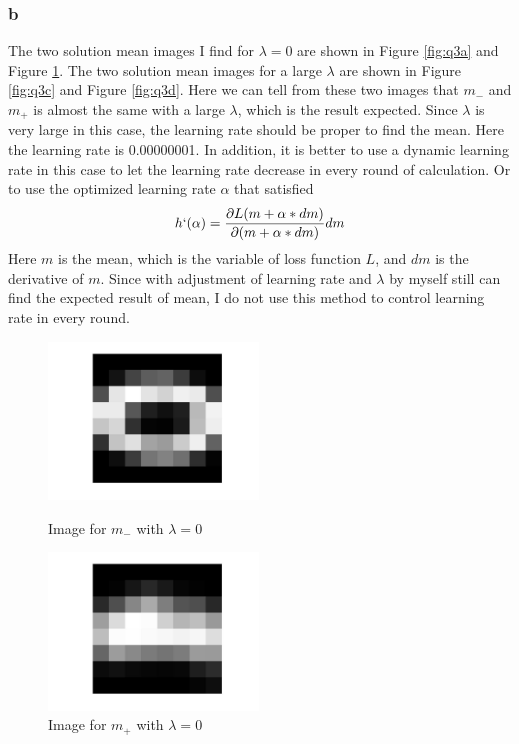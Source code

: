 \documentclass[a4paper]{scrartcl}
\begin{document}
\subsubsection{b}
The two solution mean images I find for $\lambda=0$ are shown in Figure \ref{fig:q3a} and Figure \ref{fig:q3b}.
The two solution mean images for a large $\lambda$ are shown in Figure \ref{fig:q3c} and Figure \ref{fig:q3d}.
Here we can tell from these two images that $m_-$ and $m_+$ is almost the same with a large $\lambda$, which is the result expected.
Since $\lambda$ is very large in this case, the learning rate should be proper to find the mean. 
Here the learning rate is 0.00000001. 
In addition, it is better to use a dynamic learning rate in this case to let the learning rate decrease in every round of calculation. 
Or to use the optimized learning rate $\alpha$ that satisfied $$h`(\alpha) = \frac{\partial L(m+\alpha*dm)} {\partial (m+\alpha*dm)} dm$$
Here $m$ is the mean, which is the variable of loss function $L$, and $dm$ is the derivative of $m$. 
Since with adjustment of learning rate and $\lambda$ by myself still can find the expected result of mean, I do not use this method to control learning rate in every round.

\begin{figure}[!ht]
\begin{minipage}[t]{0.5\linewidth}
\centering
\includegraphics[width=2.2in]{q3a.jpg}
\caption{Image for $m_-$ with $\lambda = 0$}
\label{fig:q3a}
\end{minipage}%
\begin{minipage}[t]{0.5\linewidth}
\centering
\includegraphics[width=2.2in]{q3b.jpg}
\caption{Image for $m_+$ with $\lambda = 0$}
\label{fig:q3b}
\end{minipage}
\end{figure}
\end{document}

